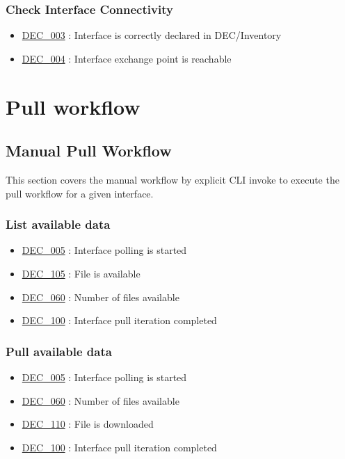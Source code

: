 \documentclass[dec_sum_main.tex]{subfiles}
\begin{document}
\subsubsection{Check Interface Connectivity}
\noindent
\begin{itemize}
    \item \hyperref[DEC003]{DEC\_003} : Interface is correctly declared in DEC/Inventory
    \item \hyperref[DEC004]{DEC\_004} : Interface exchange point is reachable
\end{itemize}

\section{Pull workflow}

\subsection{Manual Pull Workflow}
This section covers the manual workflow by explicit CLI invoke to execute the pull workflow for a given interface.

\subsubsection{List available data}
\begin{itemize}
    \item \hyperref[DEC005]{DEC\_005} : Interface polling is started
    \item \hyperref[DEC105]{DEC\_105} : File is available
    \item \hyperref[DEC060]{DEC\_060} : Number of files available
    \item \hyperref[DEC100]{DEC\_100} : Interface pull iteration completed
\end{itemize}

\subsubsection{Pull available data}
 \newline
\begin{itemize}
    \item \hyperref[DEC005]{DEC\_005} : Interface polling is started
    \item \hyperref[DEC060]{DEC\_060} : Number of files available
    \item \hyperref[DEC110]{DEC\_110} : File is downloaded
    \item \hyperref[DEC100]{DEC\_100} : Interface pull iteration completed
\end{itemize}
\end{document}
